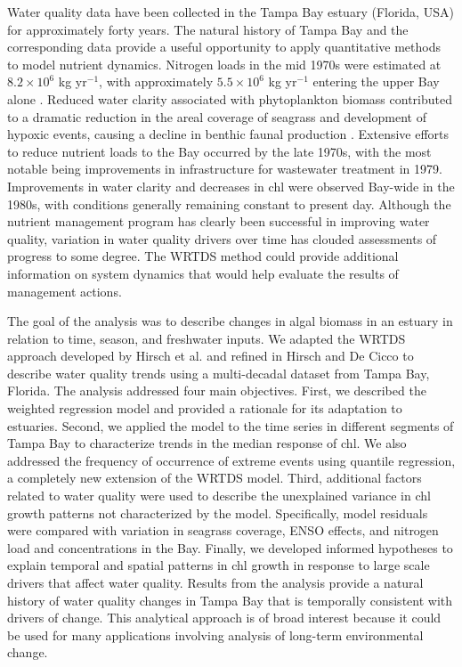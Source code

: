 \documentclass{svjour3}\usepackage[]{graphicx}\usepackage[]{color}
\begin{document}
Water quality data have been collected in the Tampa Bay estuary (Florida, USA) for approximately forty years.  The natural history of Tampa Bay and the corresponding data provide a useful opportunity to apply quantitative methods to model nutrient dynamics. Nitrogen loads in the mid 1970s were estimated at $8.2 \times 10^6$ kg yr$^{-1}$, with approximately $5.5 \times 10^6$ kg yr$^{-1}$ entering the upper Bay alone \cite{Poe05,Greening06}.  Reduced water clarity associated with phytoplankton biomass contributed to a dramatic reduction in the areal coverage of seagrass \cite{Tomasko05} and development of hypoxic events, causing a decline in benthic faunal production \cite{Santos80}.  Extensive efforts to reduce nutrient loads to the Bay occurred by the late 1970s, with the most notable being improvements in infrastructure for wastewater treatment in 1979.  Improvements in water clarity and decreases in \ac{chl} were observed Bay-wide in the 1980s, with conditions generally remaining constant to present day. Although the nutrient management program has clearly been successful in improving water quality, variation in water quality drivers over time has clouded assessments of progress to some degree.  The \ac{WRTDS} method could provide additional information on system dynamics that would help evaluate the results of management actions.

The goal of the analysis was to describe changes in algal biomass in an estuary in relation to time, season, and freshwater inputs.  We adapted the \ac{WRTDS} approach developed by Hirsch et al. \cite{Hirsch10} and refined in Hirsch and De Cicco \cite{Hirsch14} to describe water quality trends using a multi-decadal dataset from Tampa Bay, Florida. The analysis addressed four main objectives.  First, we described the weighted regression model and provided a rationale for its adaptation to estuaries.  Second, we applied the model to the time series in different segments of Tampa Bay to characterize trends in the median response of \ac{chl}.  We also addressed the frequency of occurrence of extreme events using quantile regression, a completely new extension of the \ac{WRTDS} model.  Third, additional factors related to water quality were used to describe the unexplained variance in \ac{chl} growth patterns not characterized by the model.  Specifically, model residuals were compared with variation in seagrass coverage, \ac{ENSO} effects, and nitrogen load and concentrations in the Bay.  Finally, we developed informed hypotheses to explain temporal and spatial patterns in \ac{chl} growth in response to large scale drivers that affect water quality.  Results from the analysis provide a natural history of water quality changes in Tampa Bay that is temporally consistent with drivers of change.  This analytical approach is of broad interest because it could be used for many applications involving analysis of long-term environmental change.  
\end{document}
